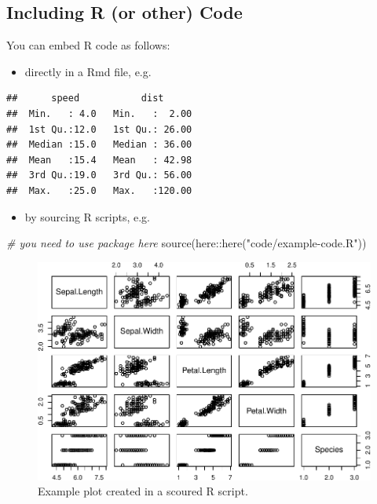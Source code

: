 \documentclass[
]{scrartcl}
\newenvironment{Shaded}{\begin{snugshade}}{\end{snugshade}}
\newcommand{\CommentTok}[1]{\textcolor[rgb]{0.56,0.35,0.01}{\textit{#1}}}
\newcommand{\FunctionTok}[1]{\textcolor[rgb]{0.00,0.00,0.00}{#1}}
\newcommand{\NormalTok}[1]{#1}
\newcommand{\SpecialCharTok}[1]{\textcolor[rgb]{0.00,0.00,0.00}{#1}}
\newcommand{\StringTok}[1]{\textcolor[rgb]{0.31,0.60,0.02}{#1}}
\providecommand{\tightlist}{%
  \setlength{\itemsep}{0pt}\setlength{\parskip}{0pt}}
\begin{document}
\hypertarget{including-r-or-other-code}{%
\subsection{Including R (or other) Code}\label{including-r-or-other-code}}

You can embed R code as follows:

\begin{itemize}
\tightlist
\item
  directly in a Rmd file, e.g.
\end{itemize}

\begin{verbatim}
##      speed           dist       
##  Min.   : 4.0   Min.   :  2.00  
##  1st Qu.:12.0   1st Qu.: 26.00  
##  Median :15.0   Median : 36.00  
##  Mean   :15.4   Mean   : 42.98  
##  3rd Qu.:19.0   3rd Qu.: 56.00  
##  Max.   :25.0   Max.   :120.00
\end{verbatim}

\begin{itemize}
\tightlist
\item
  by sourcing R scripts, e.g.
\end{itemize}

\begin{Shaded}
\begin{Highlighting}[]
\CommentTok{\# you need to use package \textasciigrave{}here\textasciigrave{}}
\FunctionTok{source}\NormalTok{(here}\SpecialCharTok{::}\FunctionTok{here}\NormalTok{(}\StringTok{"code/example{-}code.R"}\NormalTok{))}
\end{Highlighting}
\end{Shaded}

\begin{figure}
\centering
\includegraphics{00_thesis_files/figure-latex/sourcing-1.pdf}
\caption{\label{fig:sourcing}Example plot created in a scoured R script.}
\end{figure}
\end{document}
